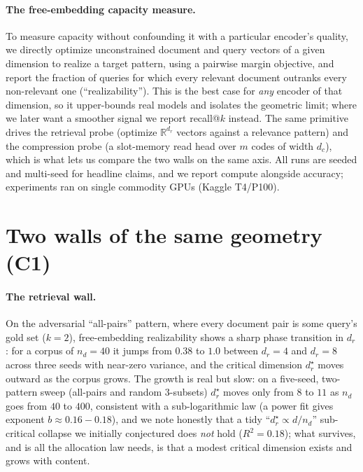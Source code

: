 \documentclass{article}
\newcommand{\dr}{d_r}
\newcommand{\dc}{d_c}
\newcommand{\R}{\mathbb{R}}
\begin{document}
\paragraph{The free-embedding capacity measure.} To measure capacity without confounding it with a
particular encoder's quality, we directly optimize unconstrained document and query vectors of a
given dimension to realize a target pattern, using a pairwise margin objective, and report the
fraction of queries for which every relevant document outranks every non-relevant one
(``realizability''). This is the best case for \emph{any} encoder of that dimension, so it
upper-bounds real models and isolates the geometric limit; where we later want a smoother signal we
report recall@$k$ instead. The same primitive drives the retrieval probe (optimize $\R^{\dr}$
vectors against a relevance pattern) and the compression probe (a slot-memory read head over $m$
codes of width $\dc$), which is what lets us compare the two walls on the same axis. All runs are
seeded and multi-seed for headline claims, and we report compute alongside accuracy; experiments
ran on single commodity GPUs (Kaggle T4/P100).

\section{Two walls of the same geometry (C1)}
\label{sec:walls}

\paragraph{The retrieval wall.} On the adversarial ``all-pairs'' pattern, where every document
pair is some query's gold set ($k=2$), free-embedding realizability shows a sharp phase transition
in $\dr$: for a corpus of $n_d=40$ it jumps from $0.38$ to $1.0$ between $\dr=4$ and $\dr=8$ across
three seeds with near-zero variance, and the critical dimension $\dr^\star$ moves outward as the
corpus grows. The growth is real but slow: on a five-seed, two-pattern sweep (all-pairs and random
$3$-subsets) $\dr^\star$ moves only from $8$ to $11$ as $n_d$ goes from $40$ to $400$, consistent
with a sub-logarithmic law (a power fit gives exponent $b\!\approx\!0.16\!-\!0.18$), and we note
honestly that a tidy ``$\dr^\star\!\propto\! d/n_d$'' sub-critical collapse we initially conjectured
does \emph{not} hold ($R^2=0.18$); what survives, and is all the allocation law needs, is that a
modest critical dimension exists and grows with content.
\end{document}
